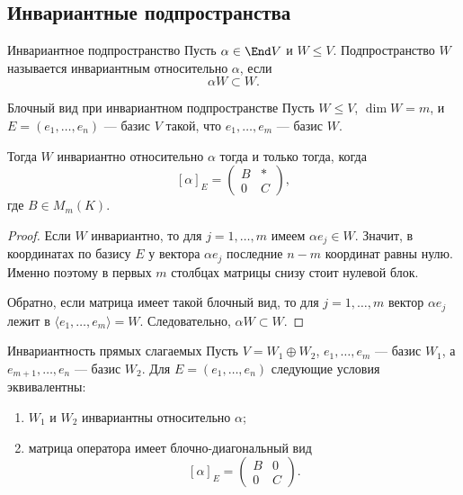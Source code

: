 \subsection{Инвариантные подпространства}

\begin{Definition}{Инвариантное подпространство}{}
	Пусть $\alpha\in \End V$ и $W\le V$.
	Подпространство $W$ называется инвариантным относительно $\alpha$, если
	\[
	\alpha W\subset W.
	\]
\end{Definition}

\begin{Theorem}{Блочный вид при инвариантном подпространстве}{}
	Пусть $W\le V$, $\dim W=m$, и
	$E=(e_1,\ldots,e_n)$ --- базис $V$ такой, что
	$e_1,\ldots,e_m$ --- базис $W$.
	
	Тогда $W$ инвариантно относительно $\alpha$ тогда и только тогда, когда
	\[
	[\alpha]_E=
	\begin{pmatrix}
		B & *\\
		0 & C
	\end{pmatrix},
	\]
	где $B\in M_m(K)$.
\end{Theorem}

\begin{proof}
	Если $W$ инвариантно, то для $j=1,\ldots,m$ имеем $\alpha e_j\in W$.
	Значит, в координатах по базису $E$ у вектора $\alpha e_j$ последние $n-m$ координат равны нулю.
	Именно поэтому в первых $m$ столбцах матрицы снизу стоит нулевой блок.
	
	Обратно, если матрица имеет такой блочный вид, то для $j=1,\ldots,m$ вектор $\alpha e_j$ лежит в $\langle e_1,\ldots,e_m\rangle=W$.
	Следовательно, $\alpha W\subset W$.
\end{proof}

\begin{Corollary}{Инвариантность прямых слагаемых}{}
	Пусть $V=W_1\oplus W_2$,
	$e_1,\ldots,e_m$ --- базис $W_1$, а $e_{m+1},\ldots,e_n$ --- базис $W_2$.
	Для $E=(e_1,\ldots,e_n)$ следующие условия эквивалентны:
	
	\begin{enumerate}
		\item $W_1$ и $W_2$ инвариантны относительно $\alpha$;
		\item матрица оператора имеет блочно-диагональный вид
		\[
		[\alpha]_E=
		\begin{pmatrix}
			B & 0\\
			0 & C
		\end{pmatrix}.
		\]
	\end{enumerate}
\end{Corollary}

